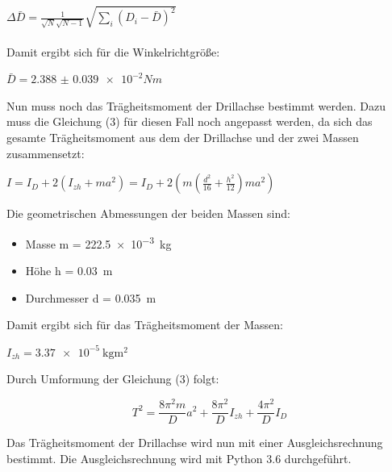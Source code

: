 $\Delta \bar{D} = \frac{1}{\sqrt{N}\sqrt{N-1}} \sqrt{\sum_{i}(D_i-\bar{D})^2}$\\\\


Damit ergibt sich für die Winkelrichtgröße:

\centerline{$\bar{D} = \num{2.388(39)e-2} Nm$}

Nun muss noch das Trägheitsmoment der Drillachse bestimmt werden. Dazu muss
die Gleichung (3) für diesen Fall noch angepasst werden, da sich das gesamte
Trägheitsmoment aus dem der Drillachse und der zwei Massen zusammensetzt:

$I = I_D + 2(I_{zh} + ma^2) = I_D + 2(m \left( \frac{d^2}{16} + \frac{h^2}{12} \right)
ma^2)$

Die geometrischen Abmessungen der beiden Massen sind:

\begin{itemize}
  \item Masse m = \SI{222.5e-3}{\kilo\gram}
  \item Höhe h = \SI{0.03}{\meter}
  \item Durchmesser d = \SI{0.035}{\meter}
\end{itemize}

Damit ergibt sich für das Trägheitsmoment der Massen:

\centerline{$I_{zh} = \SI{3.37e-5}{\kilo\gram\meter\squared}$}

Durch Umformung der Gleichung (3) folgt:

\begin{equation}
  T^2 = \frac{8\pi^2m}{D} a^2 + \frac{8\pi^2}{D} I_{zh} + \frac{4\pi^2}{D} I_D
\end{equation}


Das Trägheitsmoment der Drillachse wird nun mit einer Ausgleichsrechnung bestimmt.
Die Ausgleichsrechnung wird mit Python 3.6 durchgeführt.

